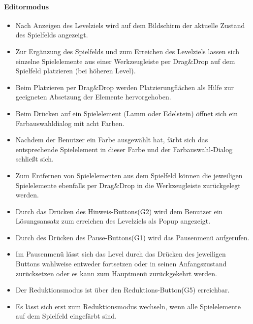 \paragraph{Editormodus}
\begin{itemize}
	\item Nach Anzeigen des Levelziels wird auf dem Bildschirm der aktuelle Zustand des Spielfelds angezeigt.
	\item Zur Ergänzung des Spielfelds und zum Erreichen des Levelziels lassen sich einzelne Spielelemente aus einer Werkzeugleiste per Drag$\&$Drop auf dem Spielfeld platzieren (bei höheren Level).
	\item Beim Platzieren per Drag$\&$Drop werden Platzierungflächen als Hilfe zur geeigneten Absetzung der Elemente hervorgehoben.
	\item Beim Drücken auf ein Spielelement (Lamm oder Edelstein) öffnet sich ein Farbauswahldialog mit acht Farben.
	\item Nachdem der Benutzer ein Farbe ausgewählt hat, färbt sich das entsprechende Spielelement in dieser Farbe und der Farbauswahl-Dialog schließt sich.
	\item Zum Entfernen von Spielelementen aus dem Spielfeld können die jeweiligen Spielelemente ebenfalls per Drag$\&$Drop in die Werkzeugleiste zurückgelegt werden.
	\item Durch das Drücken des Hinweis-Buttons(G2) wird dem Benutzer ein Lösungsansatz zum erreichen des Levelziels als Popup angezeigt.
	\item Durch des Drücken des Pause-Buttons(G1) wird das Pausenmenü aufgerufen.
	\item Im Pausenmenü lässt sich das Level durch das Drücken des jeweiligen Buttons wahlweise entweder fortsetzen oder in seinen Anfangszustand zurücksetzen oder es kann zum Hauptmenü zurückgekehrt werden.
	\item Der Reduktionsmodus ist über den Reduktions-Button(G5) erreichbar. 
	\item Es lässt sich erst zum Reduktionsmodus wechseln, wenn alle Spielelemente auf dem Spielfeld eingefärbt sind.
\end{itemize}

